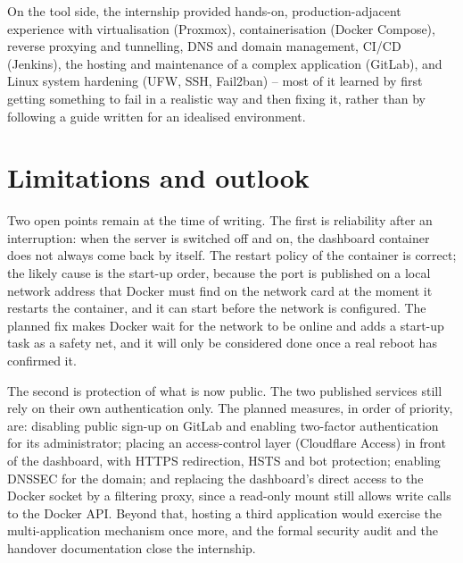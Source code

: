 On the tool side, the internship provided hands-on, production-adjacent experience with virtualisation (Proxmox), containerisation (Docker Compose), reverse proxying and tunnelling, DNS and domain management, CI/CD (Jenkins), the hosting and maintenance of a complex application (GitLab), and Linux system hardening (UFW, SSH, Fail2ban) -- most of it learned by first getting something to fail in a realistic way and then fixing it, rather than by following a guide written for an idealised environment.

\section{Limitations and outlook}
Two open points remain at the time of writing. The first is reliability after an interruption: when the server is switched off and on, the dashboard container does not always come back by itself. The restart policy of the container is correct; the likely cause is the start-up order, because the port is published on a local network address that Docker must find on the network card at the moment it restarts the container, and it can start before the network is configured. The planned fix makes Docker wait for the network to be online and adds a start-up task as a safety net, and it will only be considered done once a real reboot has confirmed it.

The second is protection of what is now public. The two published services still rely on their own authentication only. The planned measures, in order of priority, are: disabling public sign-up on GitLab and enabling two-factor authentication for its administrator; placing an access-control layer (Cloudflare Access) in front of the dashboard, with HTTPS redirection, HSTS and bot protection; enabling DNSSEC for the domain; and replacing the dashboard's direct access to the Docker socket by a filtering proxy, since a read-only mount still allows write calls to the Docker API. Beyond that, hosting a third application would exercise the multi-application mechanism once more, and the formal security audit and the handover documentation close the internship.

\clearpage
